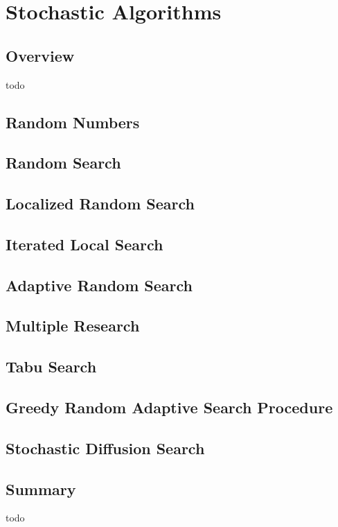 \chapter{Stochastic Algorithms}
\label{ch:stochastic}

\section{Overview}
todo

\section{Random Numbers}
\section{Random Search}
\section{Localized Random Search}
\section{Iterated Local Search}
\section{Adaptive Random Search}
\section{Multiple Research}
\section{Tabu Search}
\section{Greedy Random Adaptive Search Procedure}
\section{Stochastic Diffusion Search}

\section{Summary}
todo
